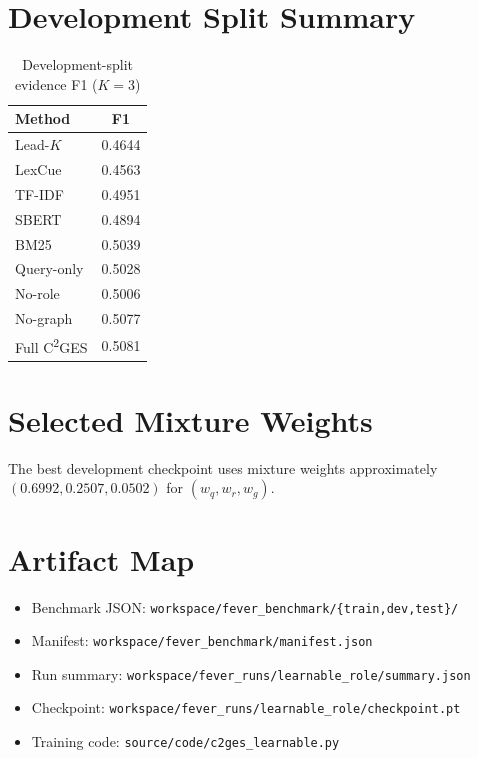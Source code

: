 \documentclass[11pt,letterpaper]{article}
\newcommand{\cges}{C\textsuperscript{2}GES}
\begin{document}
\section{Development Split Summary}
\label{sec:s3}

\begin{table}[ht]
\centering
\caption{Development-split evidence F1 ($K=3$)}
\label{tab:s3}
\begin{tabular}{lc}
\toprule
Method & F1 \\
\midrule
Lead-$K$ & 0.4644 \\
LexCue & 0.4563 \\
TF-IDF & 0.4951 \\
SBERT & 0.4894 \\
BM25 & 0.5039 \\
Query-only & 0.5028 \\
No-role & 0.5006 \\
No-graph & 0.5077 \\
Full \cges{} & 0.5081 \\
\bottomrule
\end{tabular}
\end{table}

\section{Selected Mixture Weights}
\label{sec:s4}

The best development checkpoint uses mixture weights approximately $(0.6992,0.2507,0.0502)$ for $(w_q,w_r,w_g)$.

\section{Artifact Map}
\label{sec:s5}

\begin{itemize}
  \item Benchmark JSON: \texttt{workspace/fever\_benchmark/\{train,dev,test\}/}
  \item Manifest: \texttt{workspace/fever\_benchmark/manifest.json}
  \item Run summary: \texttt{workspace/fever\_runs/learnable\_role/summary.json}
  \item Checkpoint: \texttt{workspace/fever\_runs/learnable\_role/checkpoint.pt}
  \item Training code: \texttt{source/code/c2ges\_learnable.py}
\end{itemize}
\end{document}
